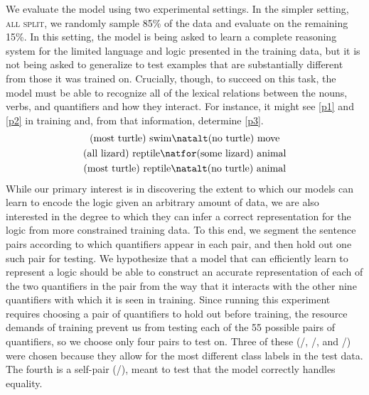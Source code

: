 We evaluate the model using two experimental settings. In the simpler
setting, \textsc{all split}, we randomly sample 85\% of the data and evaluate on the
remaining 15\%. In this setting, the model is being asked to learn a
complete reasoning system for the limited language and logic presented
in the training data, but it is not being asked to generalize to test
examples that are substantially different from those it was trained
on. Crucially, though, to succeed on this task, the model must be able
to recognize all of the lexical relations between the nouns, verbs,
and quantifiers and how they interact. For instance, it might see
\eqref{p1} and \eqref{p2} in training and, from that information,
determine \eqref{p3}.
%
%
\begin{gather}
  \text{(most turtle) swim} \natalt \text{(no turtle) move}\label{p1}
  \\
  \text{(all lizard) reptile} \natfor  \text{(some lizard) animal}\label{p2}
  \\
  \text{(most turtle) reptile} \natalt \text{(no turtle) animal}\label{p3}
\end{gather}
%
%
While our primary interest is in discovering the extent to which our
models can learn to encode the logic given an arbitrary amount of
data, we are also interested in the degree to which they can infer a
correct representation for the logic from more constrained training
data. To this end, we segment the sentence pairs according to which
quantifiers appear in each pair, and then hold out one such pair for
testing. We hypothesize that a model that can efficiently learn to
represent a logic should be able to construct an accurate
representation of each of the two quantifiers in the pair from the way that it
interacts with the other nine quantifiers with which it is seen in training. 
Since running this experiment requires choosing a pair of
quantifiers to hold out before training, the resource demands of
training prevent us from testing each of the 55 possible 
pairs of quantifiers, so we choose only four pairs to test on.  Three
of these (/, /, and
/) were chosen because they allow for the most
different class labels in the test data. The fourth is a
self-pair (/), meant to test that the model correctly
handles equality.

